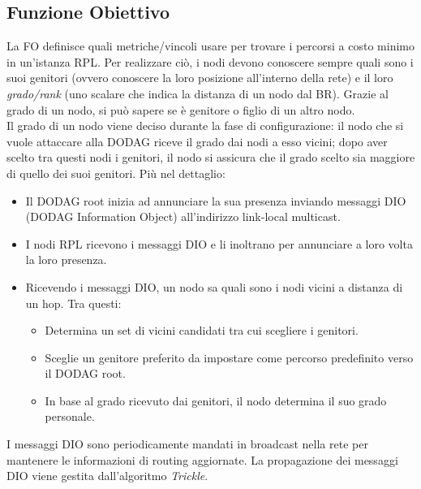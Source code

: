 \documentclass{article}
\begin{document}
\subsection{Funzione Obiettivo}
La FO definisce quali metriche/vincoli usare per trovare i percorsi a costo minimo in un'istanza RPL. Per realizzare ciò, i nodi devono conoscere sempre quali sono i suoi genitori (ovvero conoscere la loro posizione all'interno della rete) e il loro \textit{grado/rank} (uno scalare che indica la distanza di un nodo dal BR). Grazie al grado di un nodo, si può sapere se è genitore o figlio di un altro nodo. \\
Il grado di un nodo viene deciso durante la fase di configurazione: il nodo che si vuole attaccare alla DODAG riceve il grado dai nodi a esso vicini; dopo aver scelto tra questi nodi i genitori, il nodo si assicura che il grado scelto sia maggiore di quello dei suoi genitori. Più nel dettaglio:
\begin{itemize}
    \item Il DODAG root inizia ad annunciare la sua presenza inviando messaggi DIO (DODAG Information Object) all'indirizzo link-local multicast.
    \item I nodi RPL ricevono i messaggi DIO e li inoltrano per annunciare a loro volta la loro presenza.
    \item Ricevendo i messaggi DIO, un nodo sa quali sono i nodi vicini a distanza di un hop. Tra questi:
    \begin{itemize}
        \item Determina un set di vicini candidati tra cui scegliere i genitori.
        \item Sceglie un genitore preferito da impostare come percorso predefinito verso il DODAG root.
        \item In base al grado ricevuto dai genitori, il nodo determina il suo grado personale.
    \end{itemize}
\end{itemize}

I messaggi DIO sono periodicamente mandati in broadcast nella rete per mantenere le informazioni di routing aggiornate. La propagazione dei messaggi DIO viene gestita dall'algoritmo \textit{Trickle}.
\end{document}
